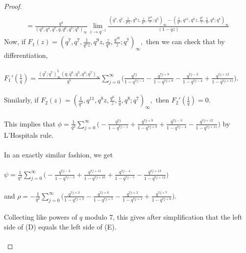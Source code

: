 \documentclass[10pt,reqno]{amsart}
\begin{document}
\begin{proof}
\begin{multline*}
\end{multline*}
\begin{multline*}
    =\displaystyle\frac{q^4}{(q^3,q^4,q^7,q,q^6,q^7;q^7)_{\infty}}\lim_{z\to q^{-1}}\displaystyle\frac{(q^7,q^7,\displaystyle\frac{1}{q^2z},q^{9}z,\displaystyle\frac{z}{q^3},\displaystyle\frac{q^{10}}{z};q^7)_{\infty}-(\displaystyle\frac{1}{q^4},q^{11},q^{8}z,\displaystyle\frac{q^6}{z},\displaystyle\frac{1}{q},q^8;q^7)_{\infty}}{(1-qz)}
\end{multline*}
Now, if $F_1(z)=(q^7,q^7,\displaystyle\frac{1}{q^2z},q^{9}z,\displaystyle\frac{z}{q^3},\displaystyle\frac{q^{10}}{z};q^7)_{\infty},$ then we can check that by differentiation, \\ \\
$F_1'(\displaystyle\frac{1}{q})=\displaystyle\frac{(q^7;q^7)_{\infty}^2(q,q^6,q^3,q^4;q^7)_{\infty}}{q^5}\sum_{j=0}^{\infty}\Bigg(\displaystyle\frac{q^{7j}}{1-q^{7j-1}}-\displaystyle\frac{q^{7j+9}}{1-q^{7j+8}}-\displaystyle\frac{q^{7j-3}}{1-q^{7j-4}}+\displaystyle\frac{q^{7j+12}}{1-q^{7j+11}}\Bigg).$ \\ \\
Similarly, if $F_2(z)=(\displaystyle\frac{1}{q^4},q^{11},q^{8}z,\displaystyle\frac{q^6}{z},\displaystyle\frac{1}{q},q^8;q^7)_{\infty},$ then $F_2'(\displaystyle\frac{1}{q})=0.$ \\ \\
This implies that $\phi=\displaystyle\frac{1}{q^2}\sum_{j=0}^{\infty}\Bigg(-\displaystyle\frac{q^{7j}}{1-q^{7j-1}}+\displaystyle\frac{q^{7j+9}}{1-q^{7j+8}}+\displaystyle\frac{q^{7j-3}}{1-q^{7j-4}}-\displaystyle\frac{q^{7j+12}}{1-q^{7j+11}}\Bigg)$ by L'Hospitals rule.\\ \\
In an exactly similar fashion, we get \\ \\ $\psi=\displaystyle\frac{1}{q^2}\sum_{j=0}^{\infty}\Bigg(-\displaystyle\frac{q^{7j-2}}{1-q^{7j-3}}+\displaystyle\frac{q^{7j+11}}{1-q^{7j+10}}+\displaystyle\frac{q^{7j-4}}{1-q^{7j-5}}-\displaystyle\frac{q^{7j+13}}{1-q^{7j+12}}\Bigg)$ \\ \\
and $\rho=-\displaystyle\frac{1}{q^2}\sum_{j=0}^{\infty}\Bigg(\displaystyle\frac{q^{7j+3}}{1-q^{7j+2}}-\displaystyle\frac{q^{7j+6}}{1-q^{7j+5}}-\displaystyle\frac{q^{7j+2}}{1-q^{7j+1}}+\displaystyle\frac{q^{7j+7}}{1-q^{7j+6}}\Bigg).$ \\ \\
Collecting like powers of $q$ modulo 7, this gives after simplification that the left side of (D) equals the left side of (E). \\ \\

\end{proof}
\end{document}
